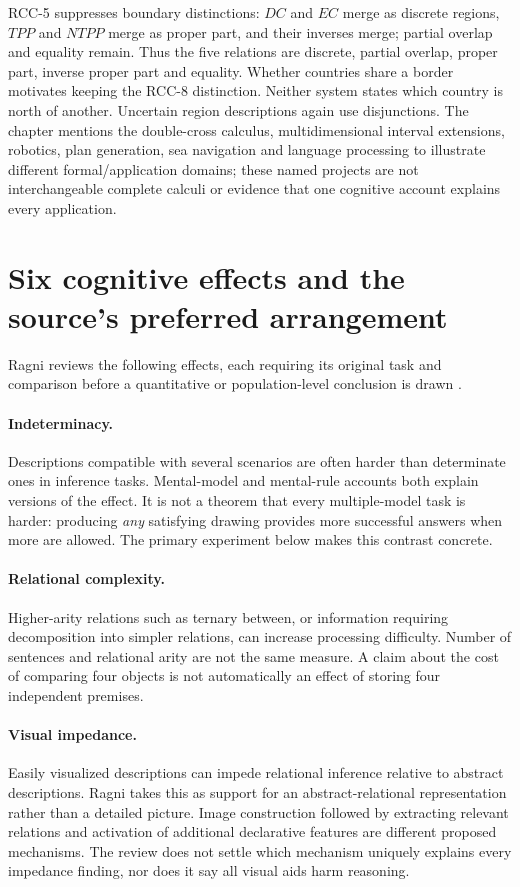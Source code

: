RCC-5 suppresses boundary distinctions: \(DC\) and \(EC\) merge
as discrete regions, \(TPP\) and \(NTPP\) merge as proper part,
and their inverses merge; partial overlap and equality remain. Thus the
five relations are discrete, partial overlap, proper part, inverse proper
part and equality. Whether countries share a border motivates keeping the
RCC-8 distinction. Neither system states which country is north of another.
Uncertain region descriptions again use disjunctions. The chapter mentions
the double-cross calculus, multidimensional interval extensions, robotics,
plan generation, sea navigation and language processing to illustrate
different formal/application domains; these named projects are not
interchangeable complete calculi or evidence that one cognitive account
explains every application.

\section{Six cognitive effects and the source's preferred arrangement}
\label{sec:p19-rat132-effects}

Ragni reviews the following effects, each requiring its original task and
comparison before a quantitative or population-level conclusion is drawn
\cite[sec.~3, pp.~728--729]{Ragni2021SpatialTemporal}.

\paragraph{Indeterminacy.} Descriptions compatible with several scenarios
are often harder than determinate ones in inference tasks. Mental-model
and mental-rule accounts both explain versions of the effect. It is not
a theorem that every multiple-model task is harder: producing \emph{any}
satisfying drawing provides more successful answers when more are allowed.
The primary experiment below makes this contrast concrete.

\paragraph{Relational complexity.} Higher-arity relations such as ternary
between, or information requiring decomposition into simpler relations,
can increase processing difficulty. Number of sentences and relational
arity are not the same measure. A claim about the cost of comparing four
objects is not automatically an effect of storing four independent premises.

\paragraph{Visual impedance.} Easily visualized descriptions can impede
relational inference relative to abstract descriptions. Ragni takes this as
support for an abstract-relational representation rather than a detailed
picture. Image construction followed by extracting relevant relations and
activation of additional declarative features are different proposed
mechanisms. The review does not settle which mechanism uniquely explains
every impedance finding, nor does it say all visual aids harm reasoning.

